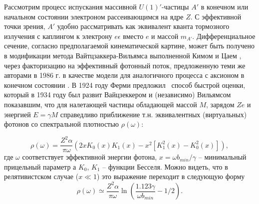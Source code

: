 Рассмотрим процесс испускания массивной $U(1)'$-частицы $A'$ в конечном или
начальном состоянии электроном рассеивающимся на ядре $Z$. С эффективной точки
зрения, $A'$ удобно рассматривать как эквивалент кванта тормозного излучения
с каплингом к электрону $e \epsilon$ вместо $e$ и массой $m_{A'}$.
Дифференциальное сечение, согласно предполагаемой кинематической картине,
может быть получено в модификации метода Вайтцзаккера-Вильямса выполненной
Кимом и Цаем \cite{KimTsaiWWReview}, через факторизацию на эффективный фотонный
поток, предложенную теми же авторами в 1986 г. в качестве модели для
аналогичного процесса с аксионом в конечном состоянии \cite{tsai.axion}.
В 1924 году Ферми предложил~\cite{Fermi1924}
способ быстрой оценки, который в 1934 году был развит Вайцзеккером и
(независимо) Вильямсом~\cite{Weizsacker1934, Williams1934} показавшим, что для налетающей частицы обладающей массой $M$,
зарядом $Ze$ и энергией $E=\gamma M$ справедливо приближение т.н. эквивалентных
(виртуальных) фотонов со спектральной плотностью $\rho (\omega)$:

\begin{equation}
    \rho ( \omega ) = \frac{Z^2 \alpha}{\pi \omega} ( 2 x K_0 (x) K_1 (x) - x^2 [K_1^2(x) - K_0^2(x) ] ),
    \label{eq:WWSpectrum}
\end{equation}
где $\omega$ соответствует эффективной энергии фотона,
$x = \omega b_{min} / \gamma$ -- минимальный прицельный параметр а
$K_0$, $K_1$ -- функции Бесселя. Можно видеть, что в релятивистском случае
($ x \ll 1 $) это выражение переходит в следующую форму
\begin{equation}
    \rho (\omega) \simeq \frac{Z^2 \alpha}{\pi \omega} \ln(\frac{1.123 \gamma}{\omega b_{min}} - 1/2).
\end{equation}


